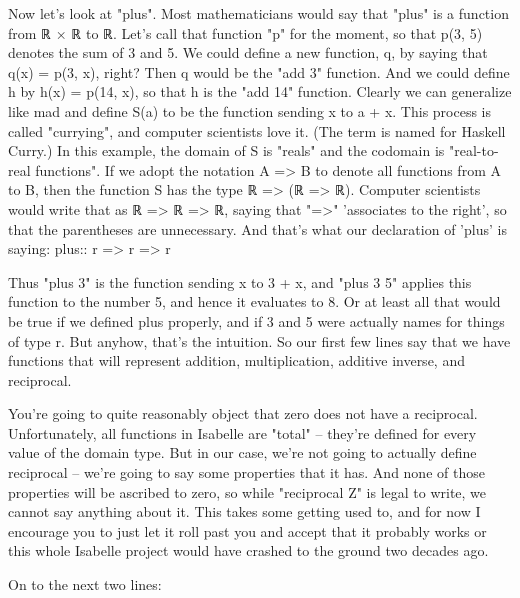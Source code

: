 Now let's look at "plus". Most mathematicians would say that "plus" is a function from ℝ × ℝ to ℝ. Let's call that function "p" for the moment, so that p(3, 5) denotes the sum of 3 and 5. We could define a new function, q, by saying that q(x) = p(3, x), right? Then q would be the "add 3" function. And we could define h by h(x) = p(14, x), so that h is the "add 14" function. Clearly we can generalize like mad and define S(a) to be the function sending x to a + x. This process is called "currying", and computer scientists love it. (The term is named for Haskell Curry.) In this example, the domain of S is "reals" and the codomain is "real-to-real functions". If we adopt the notation A => B to denote all functions from A to B, then the function S has the type
ℝ => (ℝ => ℝ). Computer scientists would write that as ℝ => ℝ => ℝ, saying that "=>" 'associates to the right', so that the parentheses are unnecessary. And that's what our declaration of 'plus' is saying: 
plus:: r => r => r

Thus "plus 3" is the function sending x to 3 + x, and "plus 3 5" applies this function to the number 5, and hence it evaluates to 8. Or at least all that would be true if we defined plus properly, and if 3 and 5 were actually names for things of type r. But anyhow, that's the intuition. So our first few lines say that we have functions that will represent addition, multiplication, additive inverse, and reciprocal. 

You're going to quite reasonably object that zero does not have a reciprocal. Unfortunately, all functions in Isabelle are "total" -- they're defined for every value of the domain type. But in our case, we're not going to actually define reciprocal -- we're going to say some properties that it has. And none of those properties will be ascribed to zero, so while "reciprocal Z" is legal to write, we cannot say anything about it. This takes some getting used to, and for now I encourage you to just let it roll past you and accept that it probably works or this whole Isabelle project would have crashed to the ground two decades ago. 

On to the next two lines:


